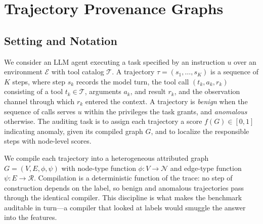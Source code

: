\section{Trajectory Provenance Graphs}
\label{sec:method}

\subsection{Setting and Notation}
\label{sec:method-setting}

We consider an LLM agent executing a task specified by an instruction $u$ over an environment $\mathcal{E}$ with tool catalog $\mathcal{T}$. A trajectory $\tau = (s_1, \dots, s_K)$ is a sequence of $K$ steps, where step $s_k$ records the model turn, the tool call $(t_k, a_k, r_k)$ consisting of a tool $t_k \in \mathcal{T}$, arguments $a_k$, and result $r_k$, and the observation channel through which $r_k$ entered the context. A trajectory is \emph{benign} when the sequence of calls serves $u$ within the privileges the task grants, and \emph{anomalous} otherwise. The auditing task is to assign each trajectory a score $f(G) \in [0,1]$ indicating anomaly, given its compiled graph $G$, and to localize the responsible steps with node-level scores.

We compile each trajectory into a heterogeneous attributed graph $G = (V, E, \phi, \psi)$ with node-type function $\phi: V \to \mathcal{N}$ and edge-type function $\psi: E \to \mathcal{R}$. Compilation is a deterministic function of the trace: no step of construction depends on the label, so benign and anomalous trajectories pass through the identical compiler. This discipline is what makes the benchmark auditable in turn---a compiler that looked at labels would smuggle the answer into the features.

